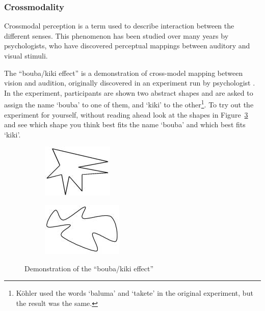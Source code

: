 \subsubsection{Crossmodality}
Crossmodal perception is a term used to describe interaction between the different senses. This phenomenon has been
studied over many years by psychologists, who have discovered perceptual mappings between auditory and visual stimuli.

The ``bouba/kiki effect'' is a demonstration of cross-model mapping between vision and audition, originally discovered
in an experiment run by psychologist \citet{Koehler1929}. In the experiment, participants are shown two abstract shapes
and are asked to assign the name `bouba' to one of them, and `kiki' to the other\footnote{K\"ohler used the words
  `baluma' and `takete' in the original experiment, but the result was the same.}. To try out the experiment for
yourself, without reading ahead look at the shapes in Figure~\ref{fig:boubakiki} and see which shape you think best
fits the name `bouba' and which best fits `kiki'.

\begin{figure}[ht]
\centering
\begin{subfigure}{.5\textwidth}
  \centering
  \includegraphics[width=0.7\linewidth]{figs/kiki.png}
  \label{fig:kiki}
\end{subfigure}%
\begin{subfigure}{.5\textwidth}
  \centering
  \includegraphics[width=0.7\linewidth]{figs/bouba.png}
  \label{fig:bouba}
\end{subfigure}
  \caption{Demonstration of the ``bouba/kiki effect'' \citep{Ramachandran2001}}
  \label{fig:boubakiki}
\end{figure}

